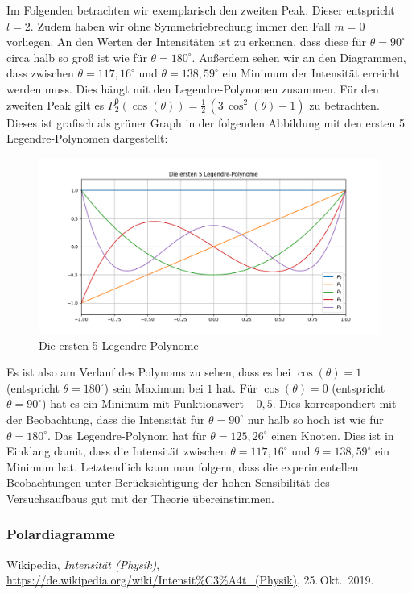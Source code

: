 \documentclass[german,  %
parskip=full,  %
]{scrartcl}
\begin{document}
Im Folgenden betrachten wir exemplarisch den zweiten Peak. Dieser entspricht $l=2$. Zudem haben wir ohne Symmetriebrechung immer den Fall $m=0$ vorliegen. An den Werten der Intensitäten ist zu erkennen, dass diese für $\theta = 90^{\circ}$ circa halb so groß ist wie für $\theta=180^{\circ}$. Außerdem sehen wir an den Diagrammen, dass zwischen $\theta=117,16^{\circ}$ und $\theta=138,59^{\circ}$ ein Minimum der Intensität erreicht werden muss. Dies hängt mit den Legendre-Polynomen zusammen. Für den zweiten Peak gilt es $P^{0}_{2}(\cos(\theta))=\frac{1}{2}\,(3\,\cos^2(\theta)-1)$ zu betrachten. Dieses ist grafisch als grüner Graph in der folgenden Abbildung mit den ersten 5 Legendre-Polynomen dargestellt:
\begin{figure}[h!]
\centering
\includegraphics[width=\textwidth]{Legendre_Polynome.png}
\caption{Die ersten 5 Legendre-Polynome}
\end{figure}
Es ist also am Verlauf des Polynoms zu sehen, dass es bei $\cos(\theta)=1$ (entspricht $\theta = 180^{\circ}$) sein Maximum bei $1$ hat. Für $\cos(\theta)=0$ (entspricht $\theta = 90^{\circ}$) hat es ein Minimum mit Funktionswert $-0,5$. Dies korrespondiert mit der Beobachtung, dass die Intensität für $\theta = 90^{\circ}$ nur halb so hoch ist wie für $\theta = 180^{\circ}$. Das Legendre-Polynom hat für $\theta = 125,26^{\circ}$ einen Knoten. Dies ist in Einklang damit, dass die Intensität zwischen $\theta=117,16^{\circ}$ und $\theta=138,59^{\circ}$ ein Minimum hat.
\newline Letztendlich kann man folgern, dass die experimentellen Beobachtungen unter Berücksichtigung der hohen Sensibilität des Versuchsaufbaus gut mit der Theorie übereinstimmen.







\subsubsection{Polardiagramme}








    \begin{thebibliography}{9}
    Wikipedia,
    \emph{Intensität (Physik)},
    \url{https://de.wikipedia.org/wiki/Intensit%C3%A4t_(Physik)},
    25.\,Okt.~2019.
    \end{thebibliography}
\end{document}
